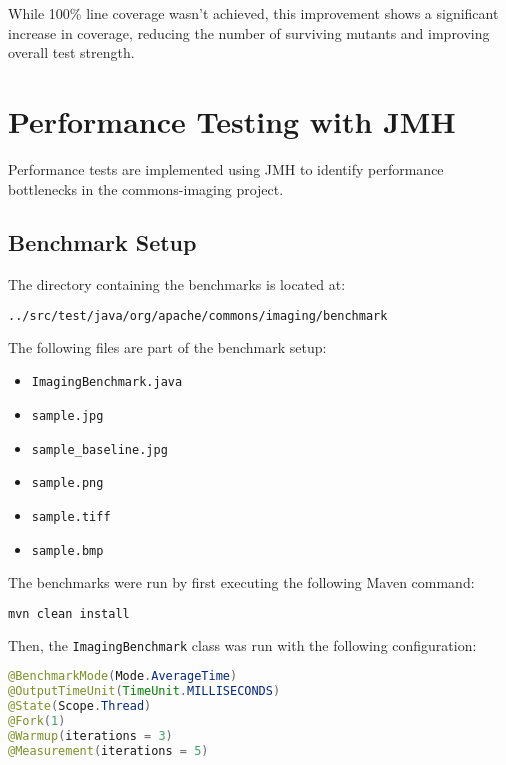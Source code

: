 \documentclass[a4paper,12pt]{report}
\begin{document}
\noindent While 100\% line coverage wasn't achieved, this improvement shows a significant increase in coverage, reducing the number of surviving mutants and improving overall test strength.

\newpage


\chapter{Performance Testing with JMH}
Performance tests are implemented using JMH to identify performance bottlenecks in the commons-imaging project.

\section{Benchmark Setup}
The directory containing the benchmarks is located at:

\begin{lstlisting}[language=bash]
../src/test/java/org/apache/commons/imaging/benchmark
\end{lstlisting}

The following files are part of the benchmark setup:
\begin{itemize}
    \item \texttt{ImagingBenchmark.java}
    \item \texttt{sample.jpg}
    \item \texttt{sample\_baseline.jpg}
    \item \texttt{sample.png}
    \item \texttt{sample.tiff}
    \item \texttt{sample.bmp}
\end{itemize}

The benchmarks were run by first executing the following Maven command:

\begin{lstlisting}[language=bash]
mvn clean install
\end{lstlisting}

Then, the \texttt{ImagingBenchmark} class was run with the following configuration:

\begin{lstlisting}[language=java, caption=ImagingBenchmark-configuration]
@BenchmarkMode(Mode.AverageTime)
@OutputTimeUnit(TimeUnit.MILLISECONDS)
@State(Scope.Thread)
@Fork(1)
@Warmup(iterations = 3)
@Measurement(iterations = 5)
\end{lstlisting}
\end{document}
